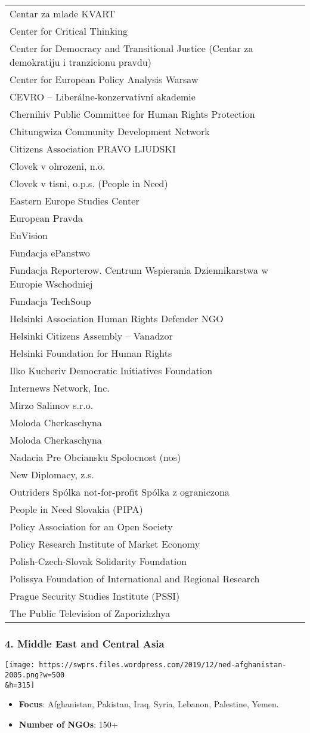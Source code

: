 \begin{longtable}[]{@{}l@{}}
\toprule
\endhead
Centar za mlade KVART\tabularnewline
Center for Critical Thinking\tabularnewline
Center for Democracy and Transitional Justice (Centar za demokratiju i
tranzicionu pravdu)\tabularnewline
Center for European Policy Analysis Warsaw\tabularnewline
CEVRO -- Liberálne-konzervativní akademie\tabularnewline
Chernihiv Public Committee for Human Rights Protection\tabularnewline
Chitungwiza Community Development Network\tabularnewline
Citizens Association PRAVO LJUDSKI\tabularnewline
Clovek v ohrozeni, n.o.\tabularnewline
Clovek v tisni, o.p.s. (People in Need)\tabularnewline
Eastern Europe Studies Center\tabularnewline
European Pravda\tabularnewline
EuVision\tabularnewline
Fundacja ePanstwo\tabularnewline
Fundacja Reporterow. Centrum Wspierania Dziennikarstwa w Europie
Wschodniej\tabularnewline
Fundacja TechSoup\tabularnewline
Helsinki Association Human Rights Defender NGO\tabularnewline
Helsinki Citizens Assembly -- Vanadzor\tabularnewline
Helsinki Foundation for Human Rights\tabularnewline
Ilko Kucheriv Democratic Initiatives Foundation\tabularnewline
Internews Network, Inc.\tabularnewline
Mirzo Salimov s.r.o.\tabularnewline
Moloda Cherkaschyna\tabularnewline
Moloda Cherkaschyna\tabularnewline
Nadacia Pre Obciansku Spolocnost (nos)\tabularnewline
New Diplomacy, z.s.\tabularnewline
Outriders Spólka not-for-profit Spólka z ograniczona\tabularnewline
People in Need Slovakia (PIPA)\tabularnewline
Policy Association for an Open Society\tabularnewline
Policy Research Institute of Market Economy\tabularnewline
Polish-Czech-Slovak Solidarity Foundation\tabularnewline
Polissya Foundation of International and Regional
Research\tabularnewline
Prague Security Studies Institute (PSSI)\tabularnewline
The Public Television of Zaporizhzhya\tabularnewline
\bottomrule
\end{longtable}

\hypertarget{4-middle-east-and-central-asia}{%
\subsubsection{4. Middle East and Central
Asia}\label{4-middle-east-and-central-asia}}

\texttt{[image: https://swprs.files.wordpress.com/2019/12/ned-afghanistan-2005.png?w=500\\\&h=315]}

\begin{itemize}
\tightlist
\item
  \textbf{Focus}: Afghanistan, Pakistan, Iraq, Syria, Lebanon,
  Palestine, Yemen.
\item
  \textbf{Number of NGOs}: 150+
\end{itemize}

